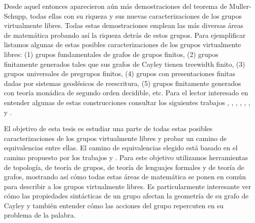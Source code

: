 \documentclass[tesis.tex]{subfiles}
\begin{document}
	Desde aquel entonces aparecieron aún más demostraciones del teorema de Muller-Schupp, todas ellas con su riqueza y sus nuevas caracterizaciones de los grupos virtualmente libres.
	Todas estas demostraciones emplean las más diversas áreas de matemática probando así la riqueza detrás de estos grupos.
    Para ejemplificar listamos algunas de estas posibles caracterizaciones de los grupos virtualmente libres: (1) grupos fundamentales de grafos de grupos finitos, (2) grupos finitamente generados tales que sus grafos de Cayley tienen treewidth finito, (3) grupos universales de pregrupos finitos, (4) grupos con presentaciones finitas dadas por sistemas geodésicos de reescritura, (5) grupos finitamente generados con teoría monádica de segundo orden decidible, etc. 
	Para el lector interesado en entender algunas de estas construcciones consultar los siguientes trabajos \cite{diekert2017context}, \cite{diekert2013context}, \cite{khukhro_characterisation_2020}, \cite{kuske2005logical}, \cite{muller1985theory}, \cite{muller1983groups}, \cite{antolin2011cayley} y \cite{araujo2017geometric}.

	El objetivo de esta tesis es estudiar una parte de todas estas posibles caracterizaciones de los grupos virtualmente libres y probar un camino de equivalencias entre ellas.
	El camino de equivalencias elegido está basado en el camino propuesto por los trabajos \cite{diekert2013context} y \cite{diekert2017context}.
	Para este objetivo utilizamos herramientas de topología, de teoría de grupos, de teoría de lenguajes formales y de teoría de grafos, 
	mostrando así cómo todas estas áreas de matemática se ponen en común para describir a los grupos virtualmente libres.
	Es particularmente interesante ver cómo las propiedades sintácticas de un grupo afectan la geometría de su grafo de Cayley y  también entender cómo las acciones del grupo repercuten en su problema de la palabra.
	
\end{document}
